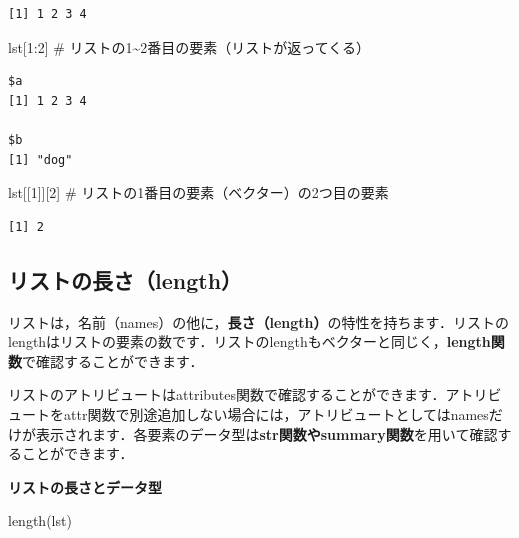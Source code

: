 \documentclass[
  letterpaper,
  DIV=11,
  numbers=noendperiod]{scrreprt}
\newenvironment{Shaded}{\begin{snugshade}}{\end{snugshade}}
\newcommand{\CommentTok}[1]{\textcolor[rgb]{0.37,0.37,0.37}{#1}}
\newcommand{\DecValTok}[1]{\textcolor[rgb]{0.68,0.00,0.00}{#1}}
\newcommand{\FunctionTok}[1]{\textcolor[rgb]{0.28,0.35,0.67}{#1}}
\newcommand{\NormalTok}[1]{\textcolor[rgb]{0.00,0.23,0.31}{#1}}
\newcommand{\SpecialCharTok}[1]{\textcolor[rgb]{0.37,0.37,0.37}{#1}}
\begin{document}
\begin{verbatim}
[1] 1 2 3 4
\end{verbatim}

\begin{Shaded}
\begin{Highlighting}[]
\NormalTok{lst[}\DecValTok{1}\SpecialCharTok{:}\DecValTok{2}\NormalTok{] }\CommentTok{\# リストの1\textasciitilde{}2番目の要素（リストが返ってくる）}
\end{Highlighting}
\end{Shaded}

\begin{verbatim}
$a
[1] 1 2 3 4

$b
[1] "dog"
\end{verbatim}

\begin{Shaded}
\begin{Highlighting}[]
\NormalTok{lst[[}\DecValTok{1}\NormalTok{]][}\DecValTok{2}\NormalTok{] }\CommentTok{\# リストの1番目の要素（ベクター）の2つ目の要素}
\end{Highlighting}
\end{Shaded}

\begin{verbatim}
[1] 2
\end{verbatim}

\hypertarget{ux30eaux30b9ux30c8ux306eux9577ux3055length}{%
\subsection{リストの長さ（length）}\label{ux30eaux30b9ux30c8ux306eux9577ux3055length}}

リストは，名前（names）の他に，\textbf{長さ（length）}の特性を持ちます．リストのlengthはリストの要素の数です．リストのlengthもベクターと同じく，\textbf{length関数}で確認することができます．

リストのアトリビュートはattributes関数で確認することができます．アトリビュートをattr関数で別途追加しない場合には，アトリビュートとしてはnamesだけが表示されます．各要素のデータ型は\textbf{str関数やsummary関数}を用いて確認することができます．

\textbf{リストの長さとデータ型}

\begin{Shaded}
\begin{Highlighting}[]
\FunctionTok{length}\NormalTok{(lst)}
\end{Highlighting}
\end{Shaded}
\end{document}
